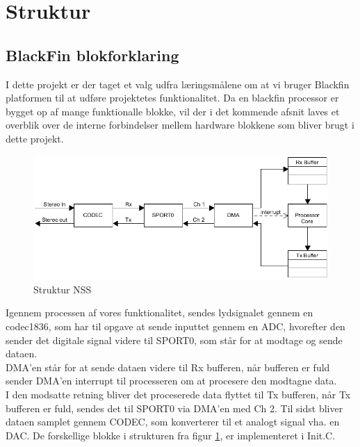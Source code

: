 \graphicspath{{Chapters/Struktur/}}

\section{Struktur}

\subsection{BlackFin blokforklaring}

I dette projekt er der taget et valg udfra læringsmålene om at vi bruger Blackfin platformen til at udføre projektetes funktionalitet. Da en blackfin processor er bygget op af mange funktionalle blokke, vil der i det kommende afsnit laves et overblik over de interne forbindelser mellem hardware blokkene som bliver brugt i dette projekt. \cite{Struktur}

\begin{figure}[H]
	\centering
	\includegraphics[width = 400pt]{Img/Struktur}
	\caption{Struktur NSS}
	\label{fig:Struktur}
\end{figure}

Igennem processen af vores funktionalitet, sendes lydsignalet gennem en codec1836, som har til opgave at sende inputtet gennem en ADC, hvorefter den sender det digitale signal videre til SPORT0, som står for at modtage og sende dataen. \\

DMA'en står for at sende dataen videre til Rx bufferen, når bufferen er fuld sender DMA'en interrupt til processeren om at procesere den modtagne data. \\
I den modsatte retning bliver det proceserede data flyttet til Tx bufferen, når Tx bufferen er fuld, sendes det til SPORT0 via DMA'en med Ch 2.  
Til sidst bliver dataen samplet gennem CODEC, som konverterer til et analogt signal vha. en DAC.
De forskellige blokke i strukturen fra figur \ref{fig:Struktur}, er implementeret i Init.C. 
  

